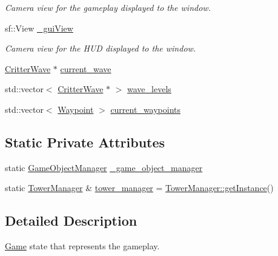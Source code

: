 \begin{DoxyCompactItemize}
\begin{DoxyCompactList}\small\item\em Camera view for the gameplay displayed to the window. \end{DoxyCompactList}\item 
sf\+::\+View \hyperlink{class_game_state_play_affee804e287fd1968fe8c5b0a303b05d}{\+\_\+gui\+View}
\begin{DoxyCompactList}\small\item\em Camera view for the H\+U\+D displayed to the window. \end{DoxyCompactList}\item 
\hyperlink{class_critter_wave}{Critter\+Wave} $\ast$ \hyperlink{class_game_state_play_a64cd6841a6f7139ff7e3747e4159654c}{current\+\_\+wave}
\item 
std\+::vector$<$ \hyperlink{class_critter_wave}{Critter\+Wave} $\ast$ $>$ \hyperlink{class_game_state_play_a97b5c39127688b4c5ddb147572f77290}{wave\+\_\+levels}
\item 
std\+::vector$<$ \hyperlink{class_waypoint}{Waypoint} $>$ \hyperlink{class_game_state_play_a14914e609fd8b83324b3fc47343ec19a}{current\+\_\+waypoints}
\end{DoxyCompactItemize}
\subsection*{Static Private Attributes}
\begin{DoxyCompactItemize}
\item 
static \hyperlink{class_game_object_manager}{Game\+Object\+Manager} \hyperlink{class_game_state_play_a3f05ff560a8dbeb5a1922e23c6bbff72}{\+\_\+game\+\_\+object\+\_\+manager}
\item 
static \hyperlink{class_tower_manager}{Tower\+Manager} \& \hyperlink{class_game_state_play_a951af277d5a8a7fca23fe3240be847c9}{tower\+\_\+manager} = \hyperlink{class_tower_manager_ad23044e56ca84962064cfcb9bee3adaf}{Tower\+Manager\+::get\+Instance}()
\end{DoxyCompactItemize}


\subsection{Detailed Description}
\hyperlink{class_game}{Game} state that represents the gameplay. 

